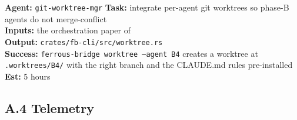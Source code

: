 \documentclass[12pt]{article}
\theoremstyle{definition}
\theoremstyle{remark}
\newenvironment{tasklist}{%
  \begingroup\raggedright
  \begin{description}[style=nextline, leftmargin=1.4cm, itemsep=0.4em]
}{%
  \end{description}
  \endgroup
}
\begin{document}
\begin{tasklist}
\item[\textbf{Task A.3.9}] \textbf{Agent:} \texttt{git-worktree-mgr} \quad
  \textbf{Task:} integrate per-agent git worktrees so phase-B agents
  do not merge-conflict\\
  \textbf{Inputs:} the orchestration paper of
  \cite{ferrousbridge2026orchestration}\\
  \textbf{Output:}
  \texttt{crates/fb-cli/src/worktree.rs}\\
  \textbf{Success:} \texttt{ferrous-bridge worktree --agent B4} creates
  a worktree at \texttt{.worktrees/B4/} with the right branch and the
  CLAUDE.md rules pre-installed\\
  \textbf{Est:} 5 hours
\end{tasklist}

\subsection*{A.4 Telemetry}
\end{document}
